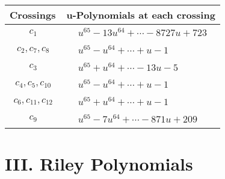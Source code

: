 \documentclass[1p]{elsarticle_modified}
\theoremstyle{definition}
\begin{document}
\begin{tabular}{m{50pt}|m{274pt}}
Crossings & \hspace{64pt}u-Polynomials at each crossing \\
\hline $$\begin{aligned}c_{1}\end{aligned}$$&$\begin{aligned}
&u^{65}-13 u^{64}+\cdots-8727 u+723
\end{aligned}$\\
\hline $$\begin{aligned}c_{2},c_{7},c_{8}\end{aligned}$$&$\begin{aligned}
&u^{65}- u^{64}+\cdots+u-1
\end{aligned}$\\
\hline $$\begin{aligned}c_{3}\end{aligned}$$&$\begin{aligned}
&u^{65}+u^{64}+\cdots-13 u-5
\end{aligned}$\\
\hline $$\begin{aligned}c_{4},c_{5},c_{10}\end{aligned}$$&$\begin{aligned}
&u^{65}- u^{64}+\cdots+u-1
\end{aligned}$\\
\hline $$\begin{aligned}c_{6},c_{11},c_{12}\end{aligned}$$&$\begin{aligned}
&u^{65}+u^{64}+\cdots+u-1
\end{aligned}$\\
\hline $$\begin{aligned}c_{9}\end{aligned}$$&$\begin{aligned}
&u^{65}-7 u^{64}+\cdots-871 u+209
\end{aligned}$\\
\hline
\end{tabular}\newpage\renewcommand{\arraystretch}{1}
\centering \section*{ III. Riley Polynomials}
\end{document}
